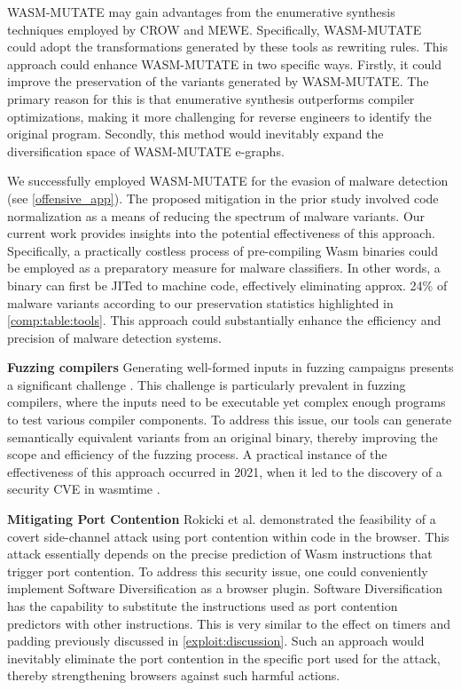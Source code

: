 WASM-MUTATE may gain advantages from the enumerative synthesis techniques employed by CROW and MEWE. 
Specifically, WASM-MUTATE could adopt the transformations generated by these tools as rewriting rules. 
This approach could enhance WASM-MUTATE in two specific ways. 
Firstly, it could improve the preservation of the variants generated by WASM-MUTATE. 
The primary reason for this is that enumerative synthesis outperforms compiler optimizations, making it more challenging for reverse engineers to identify the original program.
Secondly, this method would inevitably expand the diversification space of WASM-MUTATE e-graphs.


 We successfully employed WASM-MUTATE for the evasion of malware detection (see \autoref{offensive_app}). 
The proposed mitigation in the prior study involved code normalization as a means of reducing the spectrum of malware variants. 
Our current work provides insights into the potential effectiveness of this approach. 
Specifically, a practically costless process of pre-compiling Wasm binaries could be employed as a preparatory measure for malware classifiers. 
In other words, a \wasm binary can first be JITed to machine code, effectively eliminating approx. 24\% of malware variants according to our preservation statistics highlighted in \autoref{comp:table:tools}. 
This approach could substantially enhance the efficiency and precision of malware detection systems.




\textbf{Fuzzing \Wasm compilers}
Generating well-formed inputs in fuzzing campaigns presents a significant challenge \cite{7958599}. 
This challenge is particularly prevalent in fuzzing compilers, where the inputs need to be executable yet complex enough programs to test various compiler components. 
To address this issue, our tools can generate semantically equivalent variants from an original \wasm binary, thereby improving the scope and efficiency of the fuzzing process. 
A practical instance of the effectiveness of this approach occurred in 2021, when it led to the discovery of a security CVE in wasmtime \cite{CVE}.



\textbf{Mitigating Port Contention}
Rokicki et al. \cite{10.1145/3488932.3517411} demonstrated the feasibility of a covert side-channel attack using port contention within \Wasm code in the browser. 
This attack essentially depends on the precise prediction of Wasm instructions that trigger port contention.
To address this security issue, one could conveniently implement Software Diversification as a browser plugin. 
Software Diversification has the capability to substitute the \wasm instructions used as port contention predictors with other instructions. 
This is very similar to the effect on timers and padding previously discussed in \autoref{exploit:discussion}.
Such an approach would inevitably eliminate the port contention in the specific port used for the attack, thereby strengthening browsers against such harmful actions.



